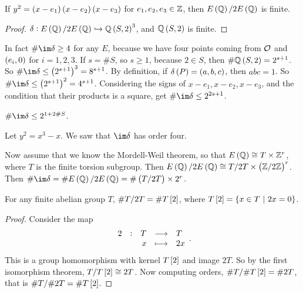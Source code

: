 \begin{theorem}
If $ y^2 = \br{x - e_1}\br{x - e_2}\br{x - e_3} $ for $ e_1, e_2, e_3 \in \mathbb{Z} $, then $ E\br{\QQ} / 2E\br{\QQ} $ is finite.
\end{theorem}

\begin{proof}
$ \delta : E\br{\QQ} / 2E\br{\QQ} \hookrightarrow \QQ\br{S, 2}^3 $, and $ \QQ\br{S, 2} $ is finite.
\end{proof}

In fact $ \#\im \delta \ge 4 $ for any $ E $, because we have four points coming from $ \mathcal{O} $ and $ \br{e_i, 0} $ for $ i = 1, 2, 3 $. If $ s = \#S $, so $ s \ge 1 $, because $ 2 \in S $, then $ \#\QQ\br{S, 2} = 2^{s + 1} $. So $ \#\im \delta \le \br{2^{s + 1}}^3 = 8^{s + 1} $. By definition, if $ \delta\br{P} = \br{a, b, c} $, then $ abc = 1 $. So $ \#\im \delta \le \br{2^{s + 1}}^2 = 4^{s + 1} $. Considering the signs of $ x - e_1, x - e_2, x - e_3 $, and the condition that their products is a square, get $ \#\im \delta \le 2^{2s + 1} $.

\begin{corollary}
$ \#\im \delta \le 2^{1 + 2\#S} $.
\end{corollary}

\begin{example}
Let $ y^2 = x^3 - x $. We saw that $ \im \delta $ has order four.
\end{example}

\pagebreak

Now assume that we know the Mordell-Weil theorem, so that $ E\br{\QQ} \cong T \times \ZZ^r $, where $ T $ is the finite torsion subgroup. Then $ E\br{\QQ} / 2E\br{\QQ} \cong T / 2T \times \br{\ZZ / 2\ZZ}^r $. Then $ \#\im \delta = \#E\br{\QQ} / 2E\br{\QQ} = \#\br{T / 2T} \times 2^r $.

\begin{lemma}
For any finite abelian group $ T $, $ \#T / 2T = \#T\sbr{2} $, where $ T\sbr{2} = \cbr{x \in T \st 2x = 0} $.
\end{lemma}

\begin{proof}
Consider the map
$$ \function[2]{T}{T}{x}{2x}. $$
This is a group homomorphism with kernel $ T\sbr{2} $ and image $ 2T $. So by the first isomorphism theorem, $ T / T\sbr{2} \cong 2T $. Now computing orders, $ \#T / \#T\sbr{2} = \#2T $, that is $ \#T / \#2T = \#T\sbr{2} $.
\end{proof}

